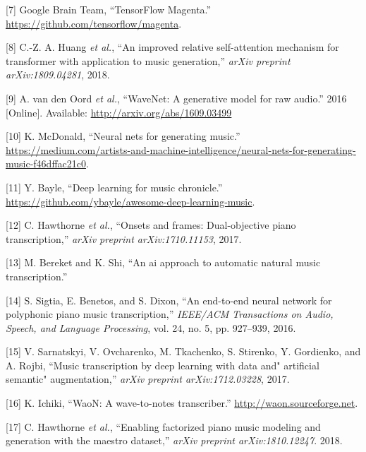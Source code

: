 \documentclass[12pt,]{article}
\begin{document}
\leavevmode\hypertarget{ref-magenta}{}%
{[}7{]} \relax Google Brain Team, ``TensorFlow Magenta.'' \\
\url{https://github.com/tensorflow/magenta}.

\leavevmode\hypertarget{ref-huang2018improved}{}%
{[}8{]} C.-Z. A. Huang \emph{et al.}, ``An improved relative
self-attention mechanism for transformer with application to music
generation,'' \emph{arXiv preprint arXiv:1809.04281}, 2018.

\leavevmode\hypertarget{ref-oord2016wavenet}{}%
{[}9{]} A. van den Oord \emph{et al.}, ``WaveNet: A generative model for
raw audio.'' 2016 {[}Online{]}. Available:
\url{http://arxiv.org/abs/1609.03499}

\leavevmode\hypertarget{ref-mediumkylemcdonald}{}%
{[}10{]} K. McDonald, ``Neural nets for generating music.'' \\
\url{https://medium.com/artists-and-machine-intelligence/neural-nets-for-generating-music-f46dffac21c0}.

\leavevmode\hypertarget{ref-libdlmusic}{}%
{[}11{]} Y. Bayle, ``Deep learning for music chronicle.'' \\
\url{https://github.com/ybayle/awesome-deep-learning-music}.

\leavevmode\hypertarget{ref-hawthorne2017onsets}{}%
{[}12{]} C. Hawthorne \emph{et al.}, ``Onsets and frames: Dual-objective
piano transcription,'' \emph{arXiv preprint arXiv:1710.11153}, 2017.

\leavevmode\hypertarget{ref-bereketai}{}%
{[}13{]} M. Bereket and K. Shi, ``An ai approach to automatic natural
music transcription.''

\leavevmode\hypertarget{ref-sigtia2016end}{}%
{[}14{]} S. Sigtia, E. Benetos, and S. Dixon, ``An end-to-end neural
network for polyphonic piano music transcription,'' \emph{IEEE/ACM
Transactions on Audio, Speech, and Language Processing}, vol. 24, no. 5,
pp. 927--939, 2016.

\leavevmode\hypertarget{ref-sarnatskyi2017music}{}%
{[}15{]} V. Sarnatskyi, V. Ovcharenko, M. Tkachenko, S. Stirenko, Y.
Gordienko, and A. Rojbi, ``Music transcription by deep learning with
data and" artificial semantic" augmentation,'' \emph{arXiv preprint
arXiv:1712.03228}, 2017.

\leavevmode\hypertarget{ref-waon}{}%
{[}16{]} K. Ichiki, ``WaoN: A wave-to-notes transcriber.''
\url{http://waon.sourceforge.net}.

\leavevmode\hypertarget{ref-maestro2018}{}%
{[}17{]} C. Hawthorne \emph{et al.}, ``Enabling factorized piano music
modeling and generation with the maestro dataset,'' \emph{arXiv preprint
arXiv:1810.12247}. 2018.
\end{document}

